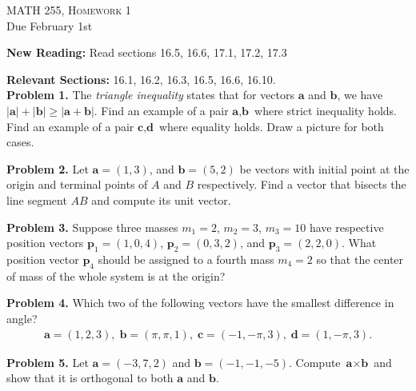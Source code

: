 \documentclass[12pt]{amsbook}
\begin{document}

\SetWatermarkText{
\begin{minipage}[c][8cm]{8cm}
\begin{center}
 
\end{center}
\end{minipage}
}



\begin{center}
   \textsc{\large MATH 255, Homework 1}\\
   Due February 1st
\end{center}
\vspace{.5cm}

\textbf{New Reading:} Read sections 16.5, 16.6, 17.1, 17.2, 17.3

\textbf{Relevant Sections:} 16.1, 16.2, 16.3, 16.5, 16.6, 16.10.\\

\textbf{Problem 1.} The \emph{triangle inequality} states that for vectors $\textbf{a}$ and $\textbf{b}$, we have $|\textbf{a}|+|\textbf{b}|\geq |\textbf{a}+\textbf{b}|$. Find an example of a pair $\textbf{a},\textbf{b}$ where strict inequality holds. Find an example of a pair $\textbf{c},\textbf{d}$ where equality holds. Draw a picture for both cases.

\noindent\textbf{Problem 2.} Let $\textbf{a}=(1,3)$, and $\textbf{b}=(5,2)$ be vectors with initial point at the origin and terminal points of $A$ and $B$ respectively. Find a vector that bisects the line segment $AB$ and compute its unit vector.

\noindent\textbf{Problem 3.} Suppose three masses $m_1 = 2$, $m_2 = 3$, $m_3 = 10$ have respective position vectors $\textbf{p}_1 = (1,0,4)$, $\textbf{p}_2 = (0,3,2)$, and $\textbf{p}_3 = (2,2,0)$. What position vector $\textbf{p}_4$ should be assigned to a fourth mass $m_4 = 2$ so that the center of mass of the whole system is at the origin?

\noindent\textbf{Problem 4.} Which two of the following vectors have the smallest difference in angle?
\begin{align*}
\textbf{a} = (1,2,3),\; \textbf{b} = (\pi,\pi,1),\; \textbf{c} = (-1,-\pi,3),\; \textbf{d} = (1,-\pi,3).
\end{align*}

\noindent\textbf{Problem 5.} Let $\textbf{a} = (-3,7,2)$ and $\textbf{b} = (-1,-1,-5)$. Compute $\textbf{a}\times\textbf{b}$ and show that it is orthogonal to both $\textbf{a}$ and $\textbf{b}$.
\end{document}
